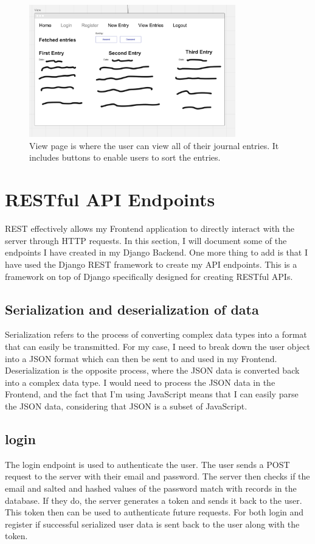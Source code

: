 \begin{figure}[H]
    \centering
    \includegraphics[width=0.8\textwidth]{Assets/view_page.png}
    \caption{View page is where the user can view all of their journal entries. It includes buttons to enable users to sort the entries.}
\end{figure}


\section{RESTful API Endpoints}
REST effectively allows my Frontend application to directly interact with the server through HTTP requests. In this section, I will document some of the endpoints I have created in my Django Backend. One more thing to add is that I have used the Django REST framework \cite{DjangoRESTFramework} to create my API endpoints. This is a framework on top of Django specifically designed for creating RESTful APIs.

\subsection{Serialization and deserialization of data}
Serialization refers to the process of converting complex data types into a format that can easily be transmitted. For my case, I need to break down the user object into a JSON format which can then be sent to and used in my Frontend. Deserialization is the opposite process, where the JSON data is converted back into a complex data type. I would need to process the JSON data in the Frontend, and the fact that I'm using JavaScript means that I can easily parse the JSON data, considering that JSON is a subset of JavaScript.

\subsection{login}
The login endpoint is used to authenticate the user. The user sends a POST request to the server with their email and password. The server then checks if the email and salted and hashed values of the password match with records in the database. If they do, the server generates a token and sends it back to the user. This token then can be used to authenticate future requests. For both login and register if successful serialized user data is sent back to the user along with the token.

